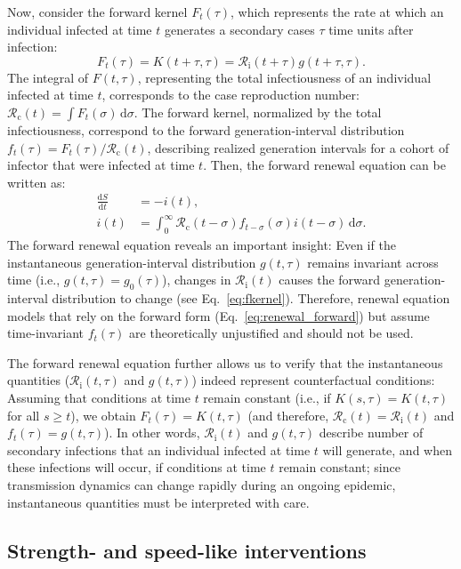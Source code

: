 \documentclass[12pt]{article}
\newcommand{\eref}[1]{Eq.~\ref{eq:#1}}
\newcommand{\Rx}[1]{\ensuremath{{\mathcal R}_{#1}}\xspace}
\newcommand{\Rc}{\Rx{\mathrm{c}}}
\newcommand{\Ri}{\Rx{\mathrm{i}}}
\newcommand{\dd}[1]{\ensuremath{\, \mathrm{d}#1}}
\newcommand{\dsigma}{\dd{\sigma}}
\begin{document}
Now, consider the forward kernel $F_t(\tau)$, which represents the rate at which an individual infected at time $t$ generates a secondary cases $\tau$ time units after infection: 
\begin{equation}
F_t(\tau) = K(t+\tau, \tau) = \Ri(t + \tau) g(t+\tau, \tau).
\label{eq:fkernel}
\end{equation}
The integral of $F(t, \tau)$, representing the total infectiousness of an individual infected at time $t$, corresponds to the case reproduction number: $\Rc(t) = \int F_t(\sigma) \dsigma$. 
The forward kernel, normalized by the total infectiousness, correspond to the forward generation-interval distribution $f_t(\tau) = F_t(\tau)/\Rc(t)$, describing realized generation intervals for a cohort of infector that were infected at time $t$.
Then, the forward renewal equation can be written as:
\begin{align}
\frac{\mathrm{d}S}{\mathrm{d}t} &= - i(t),\\
i(t) &= \int_0^\infty \Rc(t-\sigma) f_{t-\sigma}(\sigma) i(t-\sigma) \dsigma.
\label{eq:renewal_forward}
\end{align}
The forward renewal equation reveals an important insight: Even if the instantaneous generation-interval distribution $g(t, \tau)$ remains invariant across time (i.e., $g(t, \tau) = g_0(\tau)$), changes in $\Ri(t)$ causes the forward generation-interval distribution to change (see \eref{fkernel}).
Therefore, renewal equation models that rely on the forward form (\eref{renewal_forward}) but assume time-invariant $f_t(\tau)$ are theoretically unjustified and should not be used.

The forward renewal equation further allows us to verify that the instantaneous quantities ($\Ri(t, \tau)$ and $g(t, \tau)$) indeed represent counterfactual conditions:
Assuming that conditions at time $t$ remain constant (i.e., if $K(s, \tau) = K(t, \tau)$ for all $s \geq t$), we obtain $F_{t}(\tau) = K(t, \tau)$ (and therefore, $\Rc(t) = \Ri(t)$ and $f_{t}(\tau) = g(t,\tau)$).
In other words, $\Ri(t)$ and $g(t,\tau)$ describe number of secondary infections that an individual infected at time $t$ will generate, and when these infections will occur, if conditions at time $t$ remain constant;
since transmission dynamics can change rapidly during an ongoing epidemic, instantaneous quantities must be interpreted with care.

\subsection{Strength- and speed-like interventions}
\end{document}
